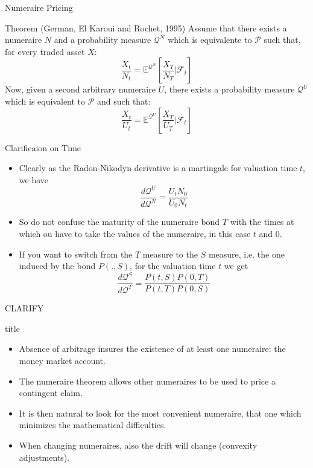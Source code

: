 \documentclass{beamer}
\begin{document}
\begin{frame}{Numeraire Pricing}
	\begin{block}{Theorem (German, El Karoui and Rochet, 1995)}
		Assume that there exists a numeraire $N$ and a probability measure $\mathcal{Q}^N$ which is equivalente to $\mathcal{P}$ such that, for every traded asset $X$:
		\begin{equation}
			\frac{X_t}{N_t} = \mathbb{E}^{\mathcal{Q}^N}\left[\frac{X_T}{N_T}|\mathcal{F}_t\right]
		\end{equation}
		Now, given a second arbitrary numeraire $U$, there exists a probability measure $\mathcal{Q}^U$ which is equivalent to $\mathcal{P}$ and such that:
		\begin{equation}
			\frac{X_t}{U_t} = \mathbb{E}^{\mathcal{Q}^U}\left[\frac{X_T}{U_T}|\mathcal{F}_t\right]
		\end{equation}
	\end{block}
\end{frame}

\begin{frame}{Clarificaion on Time}
\begin{itemize}
	\item Clearly as the Radon-Nikodyn derivative is a martingale for valuation time $t$, we have
	\begin{equation}
		\frac{d\mathcal{Q}^U}{d\mathcal{Q}^N}=\frac{U_tN_0}{U_0N_t}
	\end{equation}
\item So do not confuse the maturity of the numeraire bond $T$ with the times at which ou have to take the values of the numeraire, in this case $t$ and 0.
\item If you want to switch from the $T$ measure to the $S$ measure, i.e. the one induced by the bond $P(.,S)$, for the valuation time $t$ we get
\begin{equation}
\frac{d\mathcal{Q}^S}{d\mathcal{Q}^T}=\frac{P(t,S)P(0,T)}{P(t,T)P(0,S)}
\end{equation}
\end{itemize}
CLARIFY
\end{frame}

\begin{frame}{title}
\begin{itemize}
	\item Absence of arbitrage insures the existence of at least one numeraire: the money market account.
	\item The numeraire theorem allows other numeraires to be used to price a contingent claim.
	\item It is then natural to look for the most convenient numeraire, that one which minimizes the mathematical difficulties.
	\item When changing numeraires, also the drift will change (convexity adjustments).
\end{itemize}
\end{frame}
\end{document}
